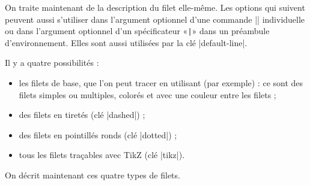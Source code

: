 \documentclass[dvipsnames]{article}
\begin{document}
\bigskip
On traite maintenant de la description du filet elle-même. Les options qui
suivent peuvent aussi s'utiliser dans l'argument optionnel d'une commande
|\Hline| individuelle ou dans l'argument optionnel d'un spécificateur «\verb+|+»
dans un préambule d'environnement. Elles sont aussi utilisées par la clé
|default-line|.

\bigskip
Il y a quatre possibilités :
\begin{itemize}[beginpenalty=10000]
\item les filets de base, que l'on peut tracer en utilisant (par exemple)
 : ce sont des filets simples ou multiples, colorés et avec une
couleur entre les filets ;

\item des filets en tiretés (clé |dashed|) ;

\item des filets en pointillés ronds (clé |dotted|) ;

\item tous les filets traçables avec TikZ (clé |tikz|).
\end{itemize}

\bigskip
On décrit maintenant ces quatre types de filets.
\end{document}
